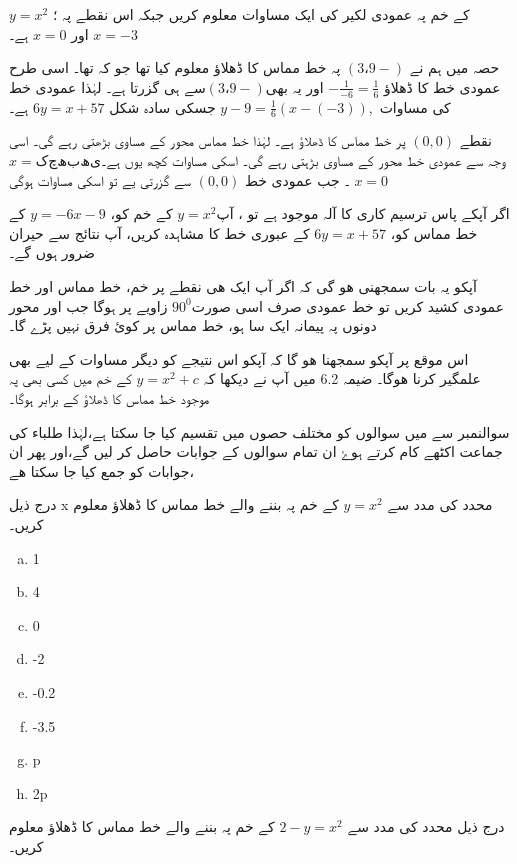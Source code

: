  \( y=x^{2} \)   
 کے خم پہ  عمودی لکیر کی ایک مساوات معلوم کریں جبکہ اس نقطے پہ ؛\(x=-3\) اور \(x=0\)  ہے۔

  حصہ میں ہم نے \(  (3،9-)   \) پہ خط مماس  کا ڈھلاؤ معلوم کیا تھا جو کہ  تھا۔ اسی طرح عمودی خط کا ڈھلاؤ \(-\frac{1}{-6} =\frac{1}{6}\) اور یہ بھی\(  (3،9-)   \)سے ہی گزرتا ہے۔ لہٰذا عمودی خط کی مساوات \( y-9=\frac{1}{6}(x-(-3)),\) جسکی سادہ شکل
\( 6y=x+57\)
ہے۔

نقطے \( (0,0)\)  پر خط مماس کا ڈھلاؤ ہے۔ لہٰذا  خط مماس محور کے مساوی بڑھتی رہے گی۔ اسی وجہ سے عمودی خط  محور کے مساوی بڑہتی رہے گی۔ اسکی مساوات کچھ یوں ہے۔\(x= کچھ بھی \)   ۔ جب عمودی خط \( (0,0)\)  سے گزرتی یے تو اسکی  مساوات ہوگی \(x= 0 \) 

اگر آپکے پاس ترسیم کاری کا آلہ موجود ہے تو ، آپ\( y=x^{2}  \) کے خم کو، \( y=-6x-9  \) کے خط مماس کو، \( 6y=x+57  \) کے عبوری خط کا مشاہدہ کریں، آپ نتائج سے حیران ضرور ہوں گے۔

آپکو یہ بات سمجھنی ھو گی کہ اگر آپ ایک ھی نقطے پر خم، خط مماس اور خط عمودی کشید کریں تو خط عمودی صرف اسی صورت\(90^0\) زاویے پر ہوگا جب   اور   محور دونوں پہ پیمانہ ایک سا ہو، خط مماس پر کوئ فرق نہیں پڑے گا۔  

اس موقع پر آپکو سمجھنا ھو گا کہ آپکو اس نتیجے کو دیگر مساوات کے لیے بھی علمگیر کرنا ھوگا۔ ضیمہ 6.2 میں آپ نے دیکھا کہ \( y=x^{2} +c \) کے خم میں کسی بھی پہ موجود خط مماس کا ڈھلاؤ  کے برابر ہوگا۔



سوالنمبر  سے  میں سوالوں کو مختلف حصوں میں تقسیم کیا جا سکتا ہے،لہٰذا طلباء کی جماعت اکٹھے کام کرتے ہوۓ ان تمام سوالوں کے جوابات حاصل کر لیں گے،اور پھر ان جوابات کو جمع کیا جا سکتا ھے،

درج ذیل x محدد کی مدد سے \( y=x^{2}\)  کے خم پہ   بننے والے خط مماس کا ڈھلاؤ معلوم کریں۔ 
\begin{enumerate}[a.]
\item 1
\item4
\item0
\item-2
\item-0.2
\item-3.5
\item p
\item 2p
\end{enumerate}


درج ذیل محدد کی مدد سے \(2- y=x^{2}\)  کے خم پہ   بننے والے خط مماس کا ڈھلاؤ معلوم کریں۔ 

